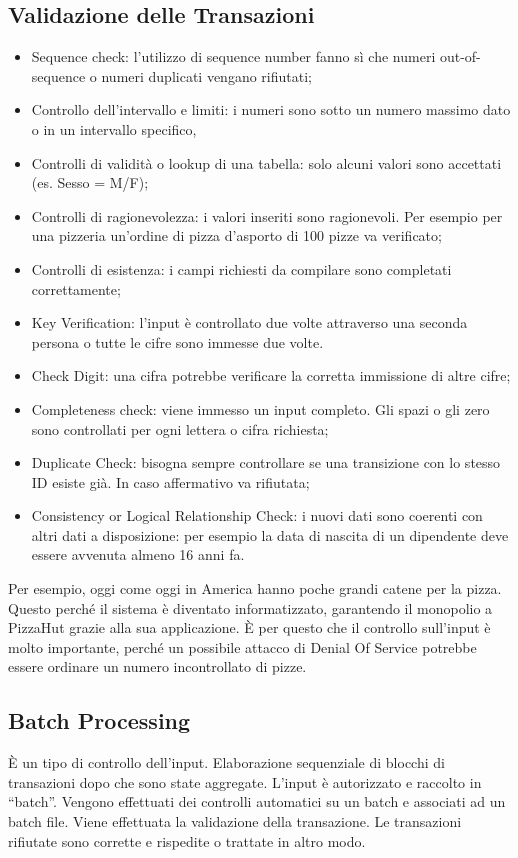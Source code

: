 \subsection{Validazione delle Transazioni}
\begin{itemize}
	\item Sequence check: l'utilizzo di sequence number fanno sì che numeri
	out-of-sequence o numeri duplicati vengano rifiutati;
	\item Controllo dell'intervallo e limiti: i numeri sono sotto un numero
	massimo dato o in un intervallo specifico,
	\item Controlli di validità o lookup di una tabella:
	solo alcuni valori sono accettati (es. Sesso = M/F);
	\item Controlli di ragionevolezza: i valori inseriti sono ragionevoli.
	Per esempio per una pizzeria un'ordine di pizza d'asporto di 100 pizze
	va verificato;
	\item Controlli di esistenza: i campi richiesti da compilare
	sono completati correttamente;
	\item Key Verification: l'input è controllato due volte attraverso
	una seconda persona o tutte le cifre sono immesse due volte.
	\item Check Digit: una cifra potrebbe verificare la corretta
	immissione di altre cifre;
	\item Completeness check: viene immesso un input completo. Gli
	spazi o gli zero sono controllati per ogni lettera o cifra 
	richiesta;
	\item Duplicate Check: bisogna sempre controllare se una transizione
	con lo stesso ID esiste già. In caso affermativo va rifiutata;
	\item Consistency or Logical Relationship Check: i nuovi dati
	sono coerenti con altri dati a disposizione: per esempio
	la data di nascita di un dipendente deve essere avvenuta almeno
	16 anni fa.
\end{itemize}

Per esempio, oggi come oggi in America hanno poche grandi catene per la pizza.
Questo perché il sistema è diventato informatizzato, garantendo il monopolio a
PizzaHut grazie alla sua applicazione. È per questo che il controllo 
sull'input è molto importante, perché un possibile attacco di Denial Of 
Service potrebbe essere ordinare un numero incontrollato di pizze.





\subsection{Batch Processing} 
È un tipo di controllo dell'input.
Elaborazione sequenziale di blocchi di transazioni
dopo che sono state aggregate. 
L'input è autorizzato e raccolto in ``batch''. Vengono effettuati
dei controlli automatici su un batch e associati ad un batch file.
Viene effettuata la validazione della transazione. Le transazioni
rifiutate sono corrette e rispedite o trattate in altro modo.

